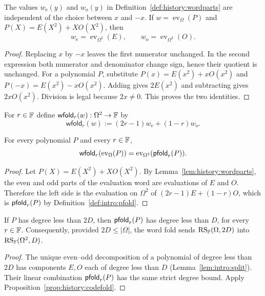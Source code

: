 \begin{lemma}\label{lem:history:wordparts}
The values $w_{\mathrm e}(y)$ and $w_{\mathrm o}(y)$ in Definition~\ref{def:history:wordparts} are independent of the choice between $x$ and $-x$. If $w=\operatorname{ev}_\Omega(P)$ and $P(X)=E(X^2)+XO(X^2)$, then
\[
 w_{\mathrm e}=\operatorname{ev}_{\Omega^2}(E),
 \qquad
 w_{\mathrm o}=\operatorname{ev}_{\Omega^2}(O).
\]
\end{lemma}
\begin{proof}
Replacing $x$ by $-x$ leaves the first numerator unchanged. In the second expression both numerator and denominator change sign, hence their quotient is unchanged.
For a polynomial $P$, substitute $P(x)=E(x^2)+xO(x^2)$ and $P(-x)=E(x^2)-xO(x^2)$. Adding gives $2E(x^2)$ and subtracting gives $2xO(x^2)$. Division is legal because $2x\neq0$. This proves the two identities.
\end{proof}

\begin{definition}\label{def:history:wfold}
For $r\in\mathbb{F}$ define $\mathsf{wfold}_r(w):\Omega^2\to\mathbb{F}$ by
\[
 \mathsf{wfold}_r(w):=(2r-1)w_{\mathrm e}+(1-r)w_{\mathrm o}.
\]
\end{definition}

\begin{proposition}\label{prop:history:codefold}
For every polynomial $P$ and every $r\in\mathbb{F}$,
\[
 \mathsf{wfold}_r(\operatorname{ev}_\Omega(P))
 =\operatorname{ev}_{\Omega^2}(\mathsf{pfold}_r(P)).
\]
\end{proposition}
\begin{proof}
Let $P(X)=E(X^2)+XO(X^2)$. By Lemma~\ref{lem:history:wordparts}, the even and odd parts of the evaluation word are evaluations of $E$ and $O$. Therefore the left side is the evaluation on $\Omega^2$ of $(2r-1)E+(1-r)O$, which is $\mathsf{pfold}_r(P)$ by Definition~\ref{def:intro:pfold}.
\end{proof}

\begin{corollary}\label{cor:history:degree}
If $P$ has degree less than $2D$, then $\mathsf{pfold}_r(P)$ has degree less than $D$, for every $r\in\mathbb{F}$. Consequently, provided $2D\leq|\Omega|$, the word fold sends $\operatorname{RS}_{\mathbb{F}}(\Omega,2D)$ into $\operatorname{RS}_{\mathbb{F}}(\Omega^2,D)$.
\end{corollary}
\begin{proof}
The unique even--odd decomposition of a polynomial of degree less than $2D$ has components $E,O$ each of degree less than $D$ (Lemma~\ref{lem:intro:split}). Their linear combination $\mathsf{pfold}_r(P)$ has the same strict degree bound. Apply Proposition~\ref{prop:history:codefold}.
\end{proof}

